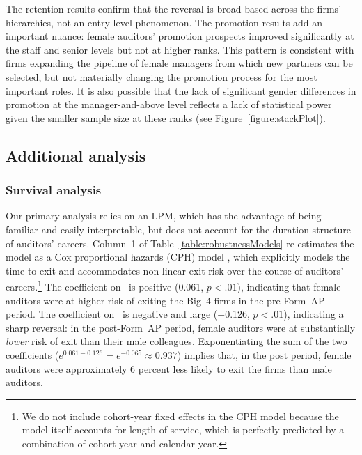 \documentclass[11pt]{article}
\begin{document}
        The retention results confirm that the reversal is broad-based across the firms' hierarchies, not an entry-level phenomenon. The promotion results add an important nuance: female auditors' promotion prospects improved significantly at the staff and senior levels but not at higher ranks. This pattern is consistent with firms expanding the pipeline of female managers from which new partners can be selected, but not materially changing the promotion process for the most important roles. It is also possible that the lack of significant gender differences in promotion at the manager-and-above level reflects a lack of statistical power given the smaller sample size at these ranks (see Figure~\ref{figure:stackPlot}). 

    \subsection{Additional analysis}\label{section:robustnessTests}

        \subsubsection{Survival analysis}\label{section:survivalAnalysis}

            Our primary analysis relies on an LPM, which has the advantage of being familiar and easily interpretable, but does not account for the duration structure of auditors' careers. Column~1 of Table~\ref{table:robustnessModels} re-estimates the model as a Cox proportional hazards (CPH) model \parencite{coxRegressionModelsLifeTables1972,statacorpStcoxCoxProportional2023}, which explicitly models the time to exit and accommodates non-linear exit risk over the course of auditors' careers.\footnote{We do not include cohort-year fixed effects in the CPH model because the model itself accounts for length of service, which is perfectly predicted by a combination of cohort-year and calendar-year.} The coefficient on \FEMALE\ is positive (0.061, $p<.01$), indicating that female auditors were at higher risk of exiting the Big~4 firms in the pre-Form~AP period. The coefficient on \FEMALExPOST\ is negative and large ($-$0.126, $p<.01$), indicating a sharp reversal: in the post-Form~AP period, female auditors were at substantially \textit{lower} risk of exit than their male colleagues. Exponentiating the sum of the two coefficients ($e^{0.061 - 0.126} = e^{-0.065} \approx 0.937$) implies that, in the post period, female auditors were approximately 6 percent less likely to exit the firms than male auditors.
\end{document}
